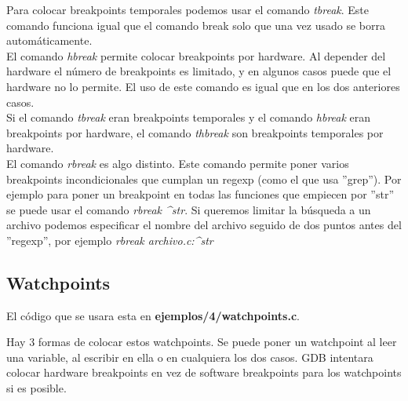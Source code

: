 Para colocar breakpoints temporales podemos usar el comando \emph{tbreak}. Este comando funciona igual que el comando break solo que una vez usado se borra automáticamente. \\

El comando \emph{hbreak} permite colocar breakpoints por hardware. Al depender del hardware el número de breakpoints es limitado, y en algunos casos puede que el hardware no lo permite. El uso de este comando es igual que en los dos anteriores casos.\\
Si el comando \emph{tbreak} eran breakpoints temporales y el comando \emph{hbreak} eran breakpoints por hardware, el comando \emph{thbreak} son breakpoints temporales por hardware.\\

El comando \emph{rbreak} es algo distinto. Este comando permite poner varios breakpoints incondicionales que cumplan un regexp (como el que usa ''grep'').  Por ejemplo para poner un breakpoint en todas las funciones que empiecen por ''str'' se puede usar el comando \emph{rbreak \textasciicircum str}. Si queremos limitar la búsqueda a un archivo podemos especificar el nombre del archivo seguido de dos puntos antes del ''regexp'', por ejemplo \emph{rbreak archivo.c:\textasciicircum str}


\subsection{Watchpoints} 
El código que se usara esta en \textbf{ejemplos/4/watchpoints.c}.

Hay 3 formas de colocar estos watchpoints. Se puede poner un watchpoint al leer una variable, al escribir en ella o en cualquiera los dos casos. GDB intentara colocar hardware breakpoints en vez de software breakpoints para los watchpoints  si es posible.

